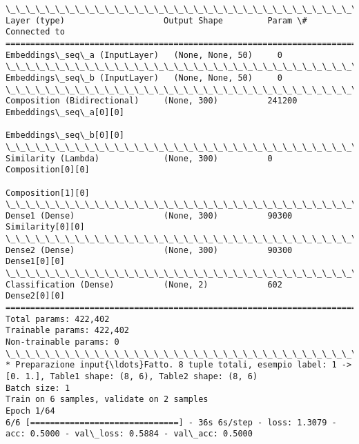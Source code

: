 \documentclass[11pt]{article}
\begin{document}
    \begin{Verbatim}[commandchars=\\\{\}]
\_\_\_\_\_\_\_\_\_\_\_\_\_\_\_\_\_\_\_\_\_\_\_\_\_\_\_\_\_\_\_\_\_\_\_\_\_\_\_\_\_\_\_\_\_\_\_\_\_\_\_\_\_\_\_\_\_\_\_\_\_\_\_\_\_\_\_\_\_\_\_\_\_\_\_\_\_\_\_\_\_\_\_\_\_\_\_\_\_\_\_\_\_\_\_\_\_\_
Layer (type)                    Output Shape         Param \#     Connected to                     
==================================================================================================
Embeddings\_seq\_a (InputLayer)   (None, None, 50)     0                                            
\_\_\_\_\_\_\_\_\_\_\_\_\_\_\_\_\_\_\_\_\_\_\_\_\_\_\_\_\_\_\_\_\_\_\_\_\_\_\_\_\_\_\_\_\_\_\_\_\_\_\_\_\_\_\_\_\_\_\_\_\_\_\_\_\_\_\_\_\_\_\_\_\_\_\_\_\_\_\_\_\_\_\_\_\_\_\_\_\_\_\_\_\_\_\_\_\_\_
Embeddings\_seq\_b (InputLayer)   (None, None, 50)     0                                            
\_\_\_\_\_\_\_\_\_\_\_\_\_\_\_\_\_\_\_\_\_\_\_\_\_\_\_\_\_\_\_\_\_\_\_\_\_\_\_\_\_\_\_\_\_\_\_\_\_\_\_\_\_\_\_\_\_\_\_\_\_\_\_\_\_\_\_\_\_\_\_\_\_\_\_\_\_\_\_\_\_\_\_\_\_\_\_\_\_\_\_\_\_\_\_\_\_\_
Composition (Bidirectional)     (None, 300)          241200      Embeddings\_seq\_a[0][0]           
                                                                 Embeddings\_seq\_b[0][0]           
\_\_\_\_\_\_\_\_\_\_\_\_\_\_\_\_\_\_\_\_\_\_\_\_\_\_\_\_\_\_\_\_\_\_\_\_\_\_\_\_\_\_\_\_\_\_\_\_\_\_\_\_\_\_\_\_\_\_\_\_\_\_\_\_\_\_\_\_\_\_\_\_\_\_\_\_\_\_\_\_\_\_\_\_\_\_\_\_\_\_\_\_\_\_\_\_\_\_
Similarity (Lambda)             (None, 300)          0           Composition[0][0]                
                                                                 Composition[1][0]                
\_\_\_\_\_\_\_\_\_\_\_\_\_\_\_\_\_\_\_\_\_\_\_\_\_\_\_\_\_\_\_\_\_\_\_\_\_\_\_\_\_\_\_\_\_\_\_\_\_\_\_\_\_\_\_\_\_\_\_\_\_\_\_\_\_\_\_\_\_\_\_\_\_\_\_\_\_\_\_\_\_\_\_\_\_\_\_\_\_\_\_\_\_\_\_\_\_\_
Dense1 (Dense)                  (None, 300)          90300       Similarity[0][0]                 
\_\_\_\_\_\_\_\_\_\_\_\_\_\_\_\_\_\_\_\_\_\_\_\_\_\_\_\_\_\_\_\_\_\_\_\_\_\_\_\_\_\_\_\_\_\_\_\_\_\_\_\_\_\_\_\_\_\_\_\_\_\_\_\_\_\_\_\_\_\_\_\_\_\_\_\_\_\_\_\_\_\_\_\_\_\_\_\_\_\_\_\_\_\_\_\_\_\_
Dense2 (Dense)                  (None, 300)          90300       Dense1[0][0]                     
\_\_\_\_\_\_\_\_\_\_\_\_\_\_\_\_\_\_\_\_\_\_\_\_\_\_\_\_\_\_\_\_\_\_\_\_\_\_\_\_\_\_\_\_\_\_\_\_\_\_\_\_\_\_\_\_\_\_\_\_\_\_\_\_\_\_\_\_\_\_\_\_\_\_\_\_\_\_\_\_\_\_\_\_\_\_\_\_\_\_\_\_\_\_\_\_\_\_
Classification (Dense)          (None, 2)            602         Dense2[0][0]                     
==================================================================================================
Total params: 422,402
Trainable params: 422,402
Non-trainable params: 0
\_\_\_\_\_\_\_\_\_\_\_\_\_\_\_\_\_\_\_\_\_\_\_\_\_\_\_\_\_\_\_\_\_\_\_\_\_\_\_\_\_\_\_\_\_\_\_\_\_\_\_\_\_\_\_\_\_\_\_\_\_\_\_\_\_\_\_\_\_\_\_\_\_\_\_\_\_\_\_\_\_\_\_\_\_\_\_\_\_\_\_\_\_\_\_\_\_\_
* Preparazione input{\ldots}Fatto. 8 tuple totali, esempio label: 1 -> [0. 1.], Table1 shape: (8, 6), Table2 shape: (8, 6)
Batch size: 1
Train on 6 samples, validate on 2 samples
Epoch 1/64
6/6 [==============================] - 36s 6s/step - loss: 1.3079 - acc: 0.5000 - val\_loss: 0.5884 - val\_acc: 0.5000


\end{Verbatim}
\end{document}
